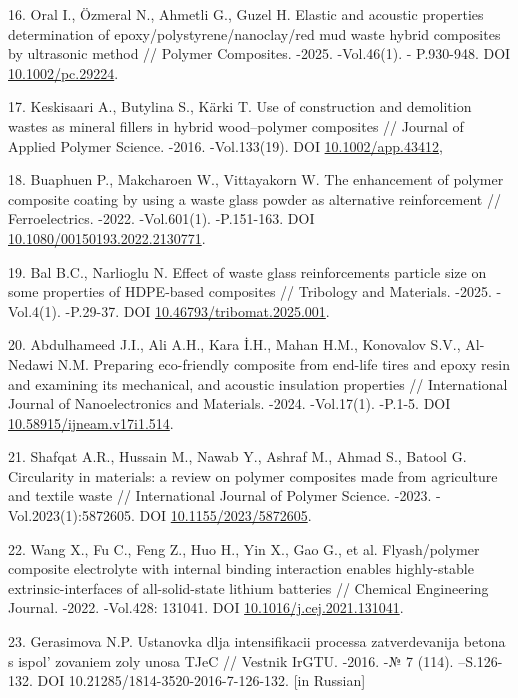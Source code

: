 \begin{refs}
16. Oral I., Özmeral N., Ahmetli G., Guzel H. Elastic and acoustic
properties determination of epoxy/polystyrene/nanoclay/red mud waste
hybrid composites by ultrasonic method // Polymer Composites. -2025.
-Vol.46(1). - P.930-948. DOI
\href{https://doi.org/10.1002/pc.29224}{10.1002/pc.29224}.

17. Keskisaari A., Butylina S., Kärki T. Use of construction and
demolition wastes as mineral fillers in hybrid wood--polymer composites
// Journal of Applied Polymer Science. -2016. -Vol.133(19). DOI
\href{https://doi.org/10.1002/app.43412?urlappend=\%3Futm_source\%3Dresearchgate.net\%26utm_medium\%3Darticle}{10.1002/app.43412},

18. Buaphuen P., Makcharoen W., Vittayakorn W. The enhancement of
polymer composite coating by using a waste glass powder as alternative
reinforcement // Ferroelectrics. -2022. -Vol.601(1). -P.151-163. DOI
\href{https://doi.org/10.1080/00150193.2022.2130771?urlappend=\%3Futm_source\%3Dresearchgate.net\%26utm_medium\%3Darticle}{10.1080/00150193.2022.2130771}.

19. Bal B.C., Narlioglu N. Effect of waste glass reinforcements particle
size on some properties of HDPE-based composites // Tribology and
Materials. -2025. -Vol.4(1). -P.29-37. DOI
\href{https://doi.org/10.46793/tribomat.2025.001}{10.46793/tribomat.2025.001}.

20. Abdulhameed J.I., Ali A.H., Kara İ.H., Mahan H.M., Konovalov S.V.,
Al-Nedawi N.M. Preparing eco-friendly composite from end-life tires and
epoxy resin and examining its mechanical, and acoustic insulation
properties // International Journal of Nanoelectronics and Materials.
-2024. -Vol.17(1). -P.1-5. DOI
\href{https://doi.org/10.58915/ijneam.v17i1.514}{10.58915/ijneam.v17i1.514}.

21. Shafqat A.R., Hussain M., Nawab Y., Ashraf M., Ahmad S., Batool G.
Circularity in materials: a review on polymer composites made from
agriculture and textile waste // International Journal of Polymer
Science. -2023. -Vol.2023(1):5872605. DOI
\href{https://doi.org/10.1155/2023/5872605}{10.1155/2023/5872605}.

22. Wang X., Fu C., Feng Z., Huo H., Yin X., Gao G., et al.
Flyash/polymer composite electrolyte with internal binding interaction
enables highly-stable extrinsic-interfaces of all-solid-state lithium
batteries // Chemical Engineering Journal. -2022. -Vol.428: 131041. DOI
\href{https://doi.org/10.1016/j.cej.2021.131041}{10.1016/j.cej.2021.131041}.

23. Gerasimova N.P. Ustanovka dlja intensifikacii processa
zatverdevanija betona s ispol' zovaniem zoly unosa TJeC
// Vestnik IrGTU. -2016. -№ 7 (114). --S.126-132. DOI
10.21285/1814-3520-2016-7-126-132. {[}in Russian{]}


\end{refs}
